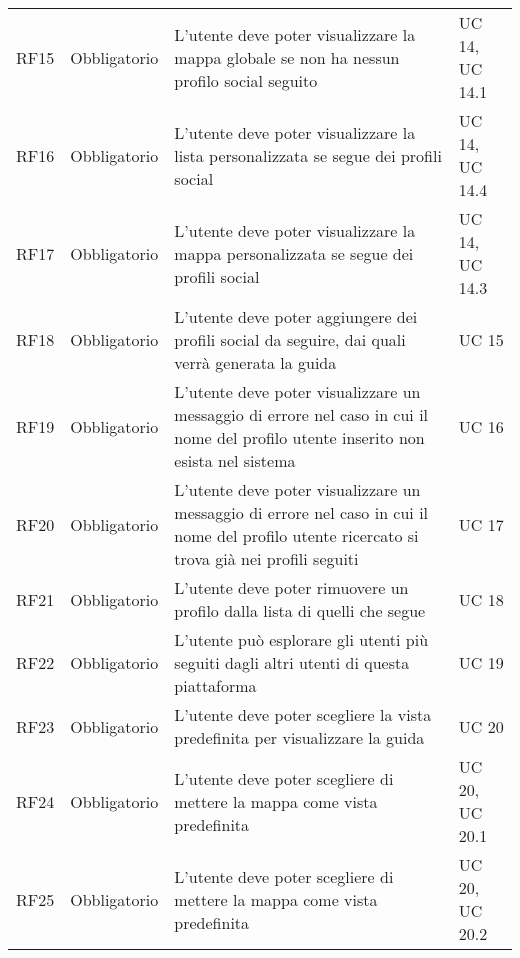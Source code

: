 {\begin{longtable}{C{.257\freewidth} C{.257\freewidth} C{.257\freewidth} C{.257\freewidth}}
      RF15 & Obbligatorio & L’utente deve poter visualizzare la mappa globale se non ha nessun profilo social seguito & UC 14, UC 14.1 \\
      RF16 & Obbligatorio & L’utente deve poter visualizzare la lista personalizzata se segue dei profili social & UC 14, UC 14.4 \\
      RF17 & Obbligatorio & L’utente deve poter visualizzare la mappa personalizzata se segue dei profili social & UC 14, UC 14.3 \\
      RF18 & Obbligatorio & L’utente deve poter aggiungere dei profili social da seguire, dai quali verrà generata la guida & UC 15 \\
      RF19 & Obbligatorio & L’utente deve poter visualizzare un messaggio di errore nel caso in cui il nome del profilo utente inserito non esista nel sistema & UC 16 \\
      RF20 & Obbligatorio & L’utente deve poter visualizzare un messaggio di errore nel caso in cui il nome del profilo utente ricercato si trova già nei profili seguiti & UC 17 \\
      RF21 & Obbligatorio & L’utente deve poter rimuovere un profilo dalla lista di quelli che segue & UC 18 \\
      RF22 & Obbligatorio & L’utente può esplorare gli utenti più seguiti dagli altri utenti di questa piattaforma & UC 19 \\
      RF23 & Obbligatorio & L’utente deve poter scegliere la vista predefinita per visualizzare la guida & UC 20 \\
      RF24 & Obbligatorio & L’utente deve poter scegliere di mettere la mappa come vista predefinita & UC 20, UC 20.1 \\
      RF25 & Obbligatorio & L’utente deve poter scegliere di mettere la mappa come vista predefinita & UC 20, UC 20.2 \\	   
      \bottomrule
      \end{longtable}
}
